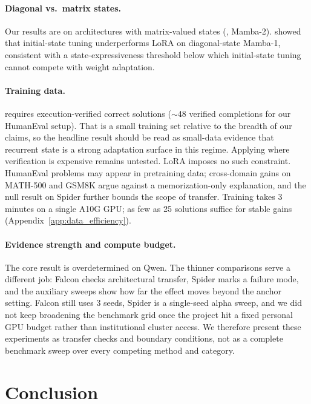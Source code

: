 \documentclass{article}
\begin{document}
\paragraph{Diagonal vs.\ matrix states.}
Our results are on architectures with matrix-valued states (\gdn, Mamba-2). \citet{galim_peft_ssm} showed that initial-state tuning underperforms LoRA on diagonal-state Mamba-1, consistent with a state-expressiveness threshold below which initial-state tuning cannot compete with weight adaptation.

\paragraph{Training data.}
\method requires execution-verified correct solutions (${\sim}$48 verified
completions for our HumanEval setup). That is a small training set relative to
the breadth of our claims, so the headline result should be read as small-data
evidence that recurrent state is a strong adaptation surface in this regime.
Applying \methodshort where verification is expensive remains untested. LoRA
imposes no such constraint. HumanEval problems may appear in pretraining data;
cross-domain gains on MATH-500 and GSM8K argue against a memorization-only
explanation, and the null result on Spider further bounds the scope of
transfer.
Training takes 3 minutes on a single A10G GPU; as few as 25 solutions suffice for stable gains (Appendix~\ref{app:data_efficiency}).

\paragraph{Evidence strength and compute budget.}
The core result is overdetermined on Qwen. The thinner comparisons serve a
different job: Falcon checks architectural transfer, Spider marks a failure
mode, and the auxiliary sweeps show how far the effect moves beyond the anchor
setting. Falcon still uses 3 seeds, Spider is a single-seed alpha sweep, and we
did not keep broadening the benchmark grid once the project hit a fixed
personal GPU budget rather than institutional cluster access. We therefore
present these experiments as transfer checks and boundary conditions, not as a
complete benchmark sweep over every competing method and category.

\section{Conclusion}
\label{sec:conclusion}
\end{document}
